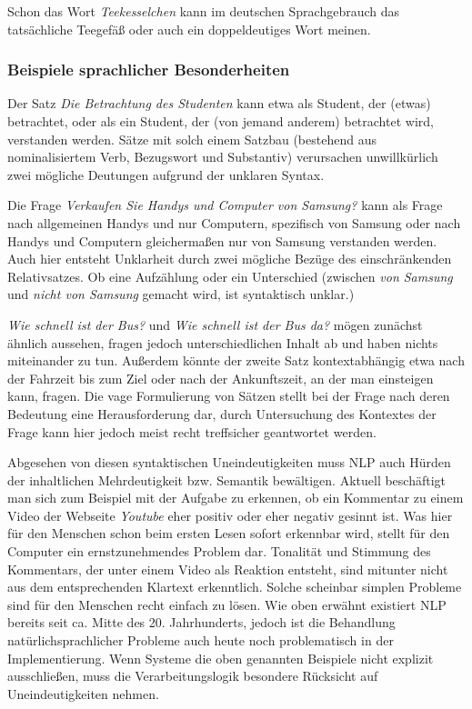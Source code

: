 \documentclass[12pt]{report}
\begin{document}
Schon das Wort \textit{Teekesselchen} kann im deutschen Sprachgebrauch das tatsächliche Teegefäß oder auch ein doppeldeutiges Wort meinen. 
\subsubsection{Beispiele sprachlicher Besonderheiten}

Der Satz \textit{\glqq   Die Betrachtung des Studenten\grqq{}} kann etwa als Student, der (etwas) betrachtet, oder als ein Student, der (von jemand anderem) betrachtet wird, verstanden werden. Sätze mit solch einem Satzbau (bestehend aus nominalisiertem Verb, Bezugswort und Substantiv) verursachen unwillkürlich zwei mögliche Deutungen aufgrund der unklaren Syntax.

Die Frage \textit{\glqq  Verkaufen Sie Handys und Computer von Samsung?\grqq{}} kann als Frage nach allgemeinen Handys und nur Computern, spezifisch von Samsung oder nach Handys und Computern gleichermaßen nur von Samsung verstanden werden. Auch hier entsteht Unklarheit durch zwei mögliche Bezüge des einschränkenden Relativsatzes. Ob eine Aufzählung oder ein Unterschied (zwischen \textit{von Samsung} und \textit{nicht von Samsung} gemacht wird, ist syntaktisch unklar.)

\textit{\glqq  Wie schnell ist der Bus?\grqq{}} und \textit{\glqq  Wie schnell ist der Bus da?\grqq{}} mögen zunächst ähnlich aussehen, fragen jedoch unterschiedlichen Inhalt ab und haben nichts miteinander zu tun. Außerdem könnte der zweite Satz kontextabhängig etwa nach der Fahrzeit bis zum Ziel oder nach der Ankunftszeit, an der man einsteigen kann, fragen. Die vage Formulierung von Sätzen stellt bei der Frage nach deren Bedeutung eine Herausforderung dar, durch Untersuchung des Kontextes der Frage kann hier jedoch meist recht treffsicher geantwortet werden.

Abgesehen von diesen syntaktischen Uneindeutigkeiten muss NLP auch Hürden der inhaltlichen Mehrdeutigkeit bzw. Semantik bewältigen. Aktuell beschäftigt man sich zum Beispiel mit der Aufgabe zu erkennen, ob ein Kommentar zu einem Video der Webseite \textit{Youtube} eher positiv oder eher negativ gesinnt ist. Was hier für den Menschen schon beim ersten Lesen sofort erkennbar wird, stellt für den Computer ein ernstzunehmendes Problem dar. Tonalität und Stimmung des Kommentars, der unter einem Video als Reaktion entsteht, sind mitunter nicht aus dem entsprechenden Klartext erkenntlich. 
Solche scheinbar simplen Probleme sind für den Menschen recht einfach zu lösen. Wie oben erwähnt existiert NLP bereits seit ca. Mitte des 20. Jahrhunderts, jedoch ist die Behandlung natürlichsprachlicher Probleme auch heute noch problematisch in der Implementierung. Wenn Systeme die oben genannten Beispiele nicht explizit ausschließen, muss die Verarbeitungslogik besondere Rücksicht auf Uneindeutigkeiten nehmen.
\end{document}
